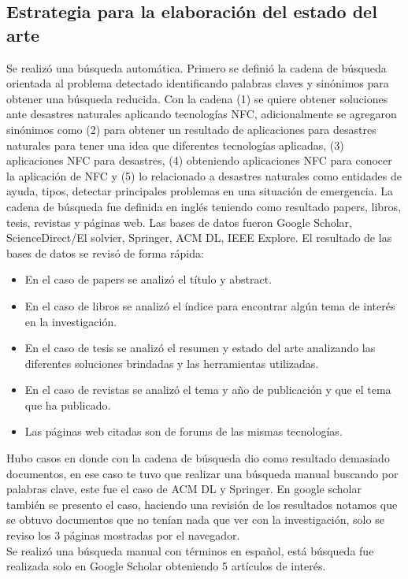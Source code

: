 \documentclass[11pt,openany]{book}
\begin{document}
	\subsection{Estrategia para la elaboración del estado del arte}
	Se realizó una búsqueda automática. Primero se definió la cadena de búsqueda orientada al problema detectado identificando palabras claves  y sinónimos para obtener una búsqueda reducida. Con la cadena (1) se quiere obtener soluciones ante desastres naturales aplicando tecnologías NFC, adicionalmente se agregaron sinónimos como (2) para obtener un resultado de aplicaciones para desastres naturales para tener una idea que diferentes tecnologías aplicadas, (3) aplicaciones NFC para desastres, (4) obteniendo aplicaciones NFC para conocer la aplicación de NFC y (5) lo relacionado a desastres naturales como entidades de ayuda, tipos, detectar principales problemas en una situación de emergencia. La cadena de búsqueda fue definida en inglés teniendo como resultado papers, libros, tesis, revistas y páginas web.
	Las bases de datos fueron Google Scholar, ScienceDirect/El solvier, Springer, ACM DL, IEEE Explore. El resultado de las bases de datos se revisó de forma rápida:
	\begin{itemize}
		\item En el caso de papers se analizó el título y abstract.
		\item En el caso de libros se analizó el índice para encontrar algún tema de interés en la investigación.
		\item En el caso de tesis se analizó el resumen y estado del arte analizando las diferentes soluciones brindadas y las herramientas utilizadas.
		\item En el caso de revistas se analizó el tema y año de publicación y que el tema que ha publicado.
		\item Las páginas web citadas son de forums de las mismas tecnologías.
	\end{itemize}
	
	Hubo casos en donde con la cadena de búsqueda dio como resultado demasiado documentos, en ese caso te tuvo que realizar una búsqueda manual buscando por palabras clave, este fue el caso de ACM DL y Springer. En google scholar también se presento el caso, haciendo una revisión de los resultados notamos que se obtuvo documentos que no tenían nada que ver con la investigación, solo se reviso los 3 páginas mostradas por el navegador. \\

	Se realizó una búsqueda manual con términos en español, está búsqueda fue realizada solo en Google Scholar obteniendo 5 artículos de interés.
\end{document}
